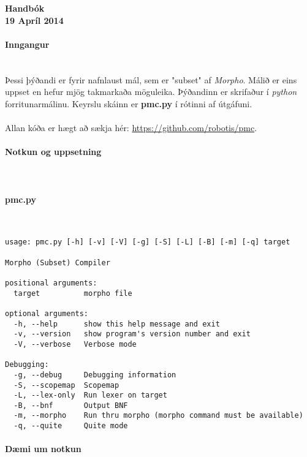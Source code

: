 \documentclass{article}
\begin{document}
\begin{center}
{\LARGE \textbf{Handbók}} ~\\
\textbf{19 Apríl 2014}
\end{center}

\clearpage
\paragraph{\Large Inngangur} ~\\

Þessi þýðandi er fyrir nafnlaust mál, sem er "subset" af \emph{Morpho}. Málið er eins uppset en
hefur mjög takmarkaða möguleika. Þýðandinn er skrifaður í \emph{python} forritunarmálinu. Keyrslu skáinn er \textbf{pmc.py} 
í rótinni af útgáfuni.
~\\
~\\
Allan kóða er hægt að sækja hér: \url{https://github.com/robotis/pmc}.

\clearpage
\paragraph{{\Large Notkun og uppsetning}} ~\\

\paragraph{pmc.py} ~\\

\begin{verbatim}
usage: pmc.py [-h] [-v] [-V] [-g] [-S] [-L] [-B] [-m] [-q] target

Morpho (Subset) Compiler

positional arguments:
  target          morpho file

optional arguments:
  -h, --help      show this help message and exit
  -v, --version   show program's version number and exit
  -V, --verbose   Verbose mode

Debugging:
  -g, --debug     Debugging information
  -S, --scopemap  Scopemap
  -L, --lex-only  Run lexer on target
  -B, --bnf       Output BNF
  -m, --morpho    Run thru morpho (morpho command must be available)
  -q, --quite     Quite mode

\end{verbatim}

\clearpage
\paragraph{Dæmi um notkun} ~\\
\end{document}

